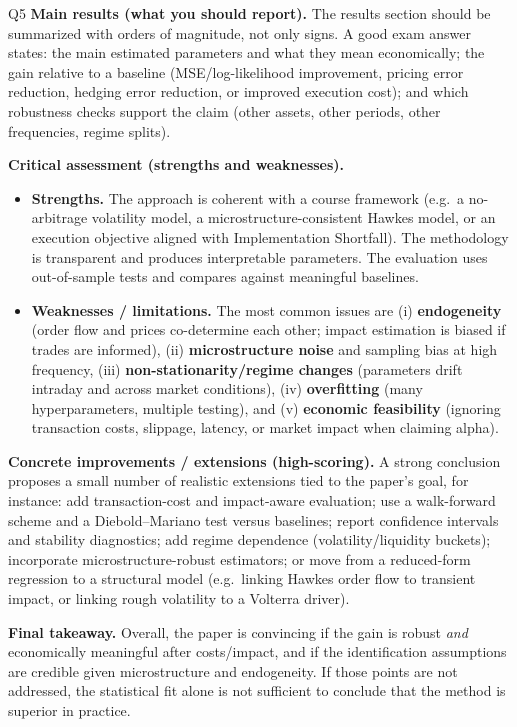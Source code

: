 \begin{solutionbox}{Q5}
\medskip
\textbf{Main results (what you should report).} The results section should be summarized with orders of magnitude, not only signs. A good exam answer states: the main estimated parameters and what they mean economically; the gain relative to a baseline (MSE/log-likelihood improvement, pricing error reduction, hedging error reduction, or improved execution cost); and which robustness checks support the claim (other assets, other periods, other frequencies, regime splits).

\medskip
\textbf{Critical assessment (strengths and weaknesses).}
\begin{itemize}[leftmargin=*]
  \item \textbf{Strengths.} The approach is coherent with a course framework (e.g.\ a no-arbitrage volatility model, a microstructure-consistent Hawkes model, or an execution objective aligned with Implementation Shortfall). The methodology is transparent and produces interpretable parameters. The evaluation uses out-of-sample tests and compares against meaningful baselines.
  \item \textbf{Weaknesses / limitations.} The most common issues are (i) \textbf{endogeneity} (order flow and prices co-determine each other; impact estimation is biased if trades are informed), (ii) \textbf{microstructure noise} and sampling bias at high frequency, (iii) \textbf{non-stationarity/regime changes} (parameters drift intraday and across market conditions), (iv) \textbf{overfitting} (many hyperparameters, multiple testing), and (v) \textbf{economic feasibility} (ignoring transaction costs, slippage, latency, or market impact when claiming alpha).
\end{itemize}

\medskip
\textbf{Concrete improvements / extensions (high-scoring).} A strong conclusion proposes a small number of realistic extensions tied to the paper's goal, for instance: add transaction-cost and impact-aware evaluation; use a walk-forward scheme and a Diebold--Mariano test versus baselines; report confidence intervals and stability diagnostics; add regime dependence (volatility/liquidity buckets); incorporate microstructure-robust estimators; or move from a reduced-form regression to a structural model (e.g.\ linking Hawkes order flow to transient impact, or linking rough volatility to a Volterra driver).

\medskip
\textbf{Final takeaway.} Overall, the paper is convincing if the gain is robust \emph{and} economically meaningful after costs/impact, and if the identification assumptions are credible given microstructure and endogeneity. If those points are not addressed, the statistical fit alone is not sufficient to conclude that the method is superior in practice.
\end{solutionbox}

